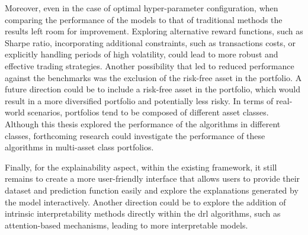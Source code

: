 Moreover, even in the case of optimal hyper-parameter configuration, when comparing the performance of the models to that of traditional methods the results left room for improvement. Exploring alternative reward functions, such as Sharpe ratio, incorporating additional constraints, such as transactions costs, or explicitly handling periods of high volatility, could lead to more robust and effective trading strategies. Another possibility that led to reduced performance against the benchmarks was the exclusion of the risk-free asset in the portfolio. A future direction could be to include a risk-free asset in the portfolio, which would result in a more diversified portfolio and potentially less risky. In terms of real-world scenarios, portfolios tend to be composed of different asset classes. Although this thesis explored the performance of the algorithms in different classes, forthcoming research could investigate the performance of these algorithms in multi-asset class portfolios.

Finally, for the explainability aspect, within the existing framework, it still remains to create a more user-friendly interface that allows users to provide their dataset and prediction function easily and explore the explanations generated by the model interactively. Another direction could be to explore the addition of intrinsic interpretability methods directly within the \acrshort{drl} algorithms, such as attention-based mechanisms, leading to more interpretable models. 